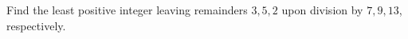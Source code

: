 Find the least positive integer leaving remainders $3,5,2$ upon division by $7,9,13$, respectively.
